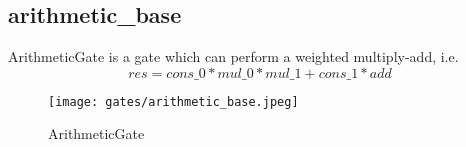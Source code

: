 \subsection{arithmetic\_base}

ArithmeticGate is a gate which can perform a weighted multiply-add, i.e.
\[res = cons\_0 * mul\_0 * mul\_1 + cons\_1 * add\]



\begin{figure}[!ht]
    \centering
    \texttt{[image: gates/arithmetic\_base.jpeg]}
    \caption{ArithmeticGate}
    \label{fig:arthmetic-gate}
\end{figure}